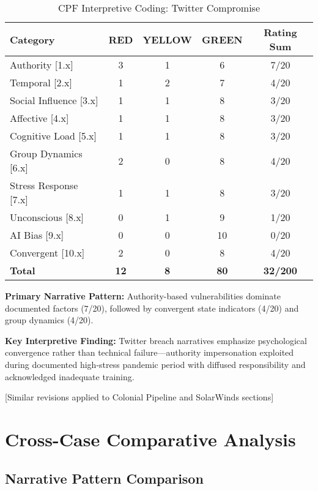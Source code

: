 \documentclass[11pt,a4paper]{article}
\begin{document}
\begin{table}[ht]
\centering
\caption{CPF Interpretive Coding: Twitter Compromise}
\label{tab:twitter_cpf}
\begin{tabular}{lcccc}
\toprule
\textbf{Category} & \textbf{RED} & \textbf{YELLOW} & \textbf{GREEN} & \textbf{Rating Sum} \\
\midrule
Authority [1.x] & 3 & 1 & 6 & 7/20 \\
Temporal [2.x] & 1 & 2 & 7 & 4/20 \\
Social Influence [3.x] & 1 & 1 & 8 & 3/20 \\
Affective [4.x] & 1 & 1 & 8 & 3/20 \\
Cognitive Load [5.x] & 1 & 1 & 8 & 3/20 \\
Group Dynamics [6.x] & 2 & 0 & 8 & 4/20 \\
Stress Response [7.x] & 1 & 1 & 8 & 3/20 \\
Unconscious [8.x] & 0 & 1 & 9 & 1/20 \\
AI Bias [9.x] & 0 & 0 & 10 & 0/20 \\
Convergent [10.x] & 2 & 0 & 8 & 4/20 \\
\midrule
\textbf{Total} & \textbf{12} & \textbf{8} & \textbf{80} & \textbf{32/200} \\
\bottomrule
\end{tabular}
\end{table}

\FloatBarrier

\textbf{Primary Narrative Pattern:} Authority-based vulnerabilities dominate documented factors (7/20), followed by convergent state indicators (4/20) and group dynamics (4/20).

\textbf{Key Interpretive Finding:} Twitter breach narratives emphasize psychological convergence rather than technical failure—authority impersonation exploited during documented high-stress pandemic period with diffused responsibility and acknowledged inadequate training.

[Similar revisions applied to Colonial Pipeline and SolarWinds sections]

\section{Cross-Case Comparative Analysis}

\subsection{Narrative Pattern Comparison}
\end{document}
